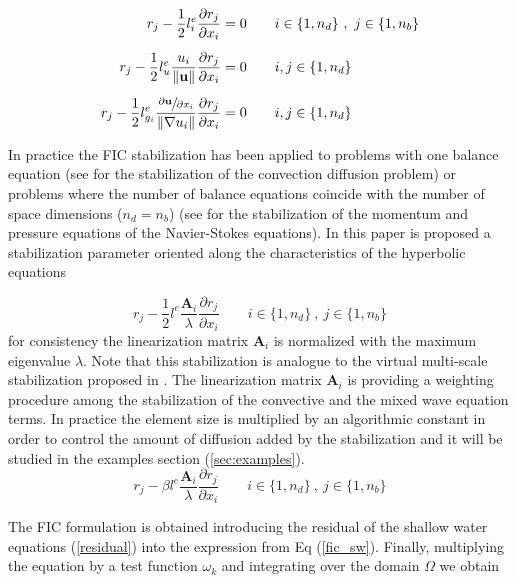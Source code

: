 \documentclass[a4paper,12pt]{article}
\newcommand{\pder}[2]{\frac{\partial#1}{\partial#2}}
\newcommand{\norm}[1]{\lVert#1\rVert}
\begin{document}
\begin{subequations}
\begin{align}
r_j - \frac{1}{2}l^e_i\pder{r_j}{x_i} &= 0
    \qquad i\in\{1,n_d\} \ ,\ j\in\{1,n_b\}\\[5pt]
r_j - \frac{1}{2}l^e_u\frac{u_i}{\norm{\mathbf{u}}}\pder{r_j}{x_i} &= 0
    \qquad i,j\in\{1,n_d\}\\[5pt]
r_j - \frac{1}{2}l^e_{g_i}\frac{\sfrac{\partial\mathbf{u}}{\partial x_i}}{\norm{\nabla u_i}}\pder{r_j}{x_i} &= 0
    \qquad i,j\in\{1,n_d\}
\end{align}
\end{subequations}


In practice the FIC stabilization has been applied to problems with one balance equation (see \cite{onate1998} for the stabilization of the convection diffusion problem) or problems where the number of balance equations coincide with the number of space dimensions ($n_d = n_b$) (see \cite{onate1998} for the stabilization of the momentum and pressure equations of the Navier-Stokes equations). In this paper is proposed a stabilization parameter oriented along the characteristics of the hyperbolic equations

\begin{equation} \label{fic_sw}
r_j - \frac{1}{2}l^e\frac{\mathbf{A}_i}{\lambda}\pder{r_j}{x_i}
    \qquad i\in\{1,n_d\} \ ,\ j\in\{1,n_b\}
\end{equation}
for consistency the linearization matrix $\mathbf{A}_i$ is normalized with the maximum eigenvalue $\lambda$. Note that this stabilization is analogue to the virtual multi-scale stabilization proposed in \cite{codina2008b}. The linearization matrix $\mathbf{A}_i$ is providing a weighting procedure among the stabilization of the convective and the mixed wave equation terms. In practice the element size is multiplied by an algorithmic constant in order to control the amount of diffusion added by the stabilization and it will be studied in the examples section (\ref{sec:examples}).
\begin{equation} \label{fic_sw_beta}
r_j - \beta l^e\frac{\mathbf{A}_i}{\lambda}\pder{r_j}{x_i}
    \qquad i\in\{1,n_d\} \ ,\ j\in\{1,n_b\}
\end{equation}

The FIC formulation is obtained introducing the residual of the shallow water equations (\ref{residual}) into the expression from Eq (\ref{fic_sw}). Finally, multiplying the equation by a test function $\omega_k$ and integrating over the domain $\Omega$ we obtain
\end{document}
